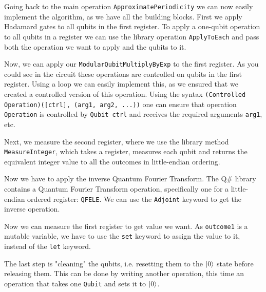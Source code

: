 

Going back to the main operation \texttt{ApproximatePeriodicity} we can now easily implement the algorithm, as we have all the building blocks. First we apply Hadamard gates to all qubits in the first register. To apply a one-qubit operation to all qubits in a register we can use the library operation \texttt{ApplyToEach} and pass both the operation we want to apply and the qubits to it. 



Now, we can apply our \texttt{ModularQubitMultiplyByExp} to the first register. As you could see in the circuit these operations are controlled on qubits in the first register. Using a loop we can easily implement this, as we ensured that we created a controlled version of this operation. Using the syntax \texttt{(Controlled Operation)([ctrl], (arg1, arg2, ...))} one can ensure that operation \texttt{Operation} is controlled by \texttt{Qubit ctrl} and receives the required arguments \texttt{arg1}, etc. 



Next, we measure the second register, where we use the library method \texttt{MeasureInteger}, which takes a register, measures each qubit and returns the equivalent integer value to all the outcomes in little-endian ordering.



Now we have to apply the inverse Quantum Fourier Transform. The Q\# library contains a Quantum Fourier Transform operation, specifically one for a little-endian ordered register: \texttt{QFELE}. We can use the \texttt{Adjoint} keyword to get the inverse operation. 



Now we can measure the first register to get value we want. As \texttt{outcome1} is a mutable variable, we have to use the \texttt{set} keyword to assign the value to it, instead of the \texttt{let} keyword.



The last step is "cleaning" the qubits, i.e. resetting them to the $\left\vert{0}\right\rangle$ state before releasing them. This can be done by writing another operation, this time an operation that takes one \texttt{Qubit} and sets it to  $\left\vert{0}\right\rangle$. 

